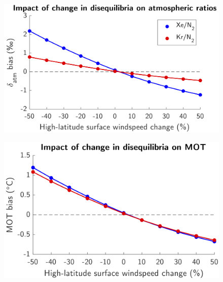 \documentclass{beamer}
\begin{document}
\begin{frame}
	\begin{figure}
        	\centering
		\vfill
        	\includegraphics[width=\textwidth]{images/2}
        	\label{fig:2}
        	\vfill
    	\end{figure}    
\end{frame}

\begin{frame}
	\begin{figure}
        	\centering
		\vfill
        	\includegraphics[width=\textwidth]{images/3}
        	\label{fig:3}
        	\vfill
    	\end{figure}    
\end{frame}
\end{document}
